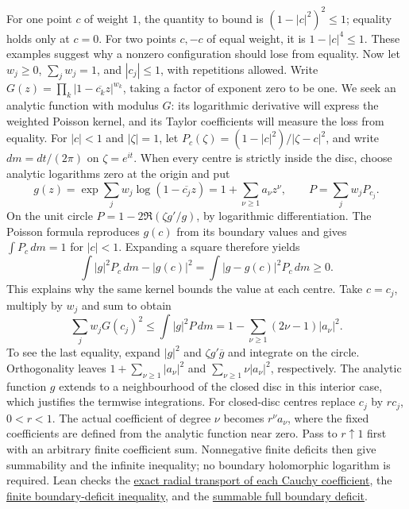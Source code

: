 For one point $c$ of weight $1$, the quantity to bound is
$(1-|c|^2)^2\le1$; equality holds only at $c=0$.
For two points $c,-c$ of equal weight, it is $1-|c|^4\le1$.
These examples suggest why a nonzero configuration should lose from equality.
Now let $w_j\ge0$, $\sum_jw_j=1$, and $|c_j|\le1$, with repetitions allowed.
Write $G(z)=\prod_k|1-\overline{c_k}z|^{w_k}$, taking a factor of
exponent zero to be one. We seek an analytic function with modulus $G$:
its logarithmic derivative will express the weighted Poisson kernel,
and its Taylor coefficients will measure the loss from equality.
For $|c|<1$ and $|\zeta|=1$, let
$P_c(\zeta)=(1-|c|^2)/|\zeta-c|^2$, and write $dm=dt/(2\pi)$ on
$\zeta=e^{it}$. When every centre is strictly inside the disc, choose
analytic logarithms zero at the origin and put
\[
 g(z)=\exp\sum_jw_j\log(1-\overline{c_j}z)
     =1+\sum_{\nu\ge1}a_\nu z^\nu,\qquad
 P=\sum_jw_jP_{c_j}.
\]
On the unit circle $P=1-2\Re(\zeta g'/g)$, by logarithmic
differentiation. The Poisson formula reproduces $g(c)$ from its boundary
values and gives $\int P_c\,dm=1$ for $|c|<1$. Expanding a square therefore
yields
\[
 \int |g|^2P_c\,dm-|g(c)|^2
   =\int |g-g(c)|^2P_c\,dm\ge0.
\]
This explains why the same kernel bounds the value at each centre.
Take $c=c_j$, multiply by $w_j$ and sum to obtain
\[
 \sum_jw_jG(c_j)^2\le\int |g|^2P\,dm
 =1-\sum_{\nu\ge1}(2\nu-1)|a_\nu|^2.
\]
To see the last equality, expand $|g|^2$ and
$\zeta g'\overline g$ and integrate on the circle. Orthogonality leaves
$1+\sum_{\nu\ge1}|a_\nu|^2$ and
$\sum_{\nu\ge1}\nu|a_\nu|^2$, respectively. The analytic function $g$ extends to a neighbourhood of the closed disc
in this interior case,
which justifies the termwise integrations.
For closed-disc centres replace $c_j$ by $rc_j$, $0<r<1$.
The actual coefficient of degree $\nu$ becomes $r^\nu a_\nu$, where the
fixed coefficients are defined from the analytic function near zero.
Pass to $r\uparrow1$ first with an arbitrary finite coefficient sum.
Nonnegative finite deficits then give summability and the infinite inequality;
no boundary holomorphic logarithm is required. Lean checks the
\href{https://github.com/wcook04/plectis-erdos/blob/1d70482583cc9c662cd3b86f66d75c54bb405aa6/lean/ErdosProblems/Erdos1041/WeightedCauchyTransportR10.lean\#L66}{exact radial transport of each Cauchy coefficient},
the
\href{https://github.com/wcook04/plectis-erdos/blob/1d70482583cc9c662cd3b86f66d75c54bb405aa6/lean/ErdosProblems/Erdos1041/WeightedBoundaryDeficitR10.lean\#L108}{finite boundary-deficit inequality},
and the
\href{https://github.com/wcook04/plectis-erdos/blob/1d70482583cc9c662cd3b86f66d75c54bb405aa6/lean/ErdosProblems/Erdos1041/WeightedBoundaryDeficitR10.lean\#L153}{summable full boundary deficit}.

